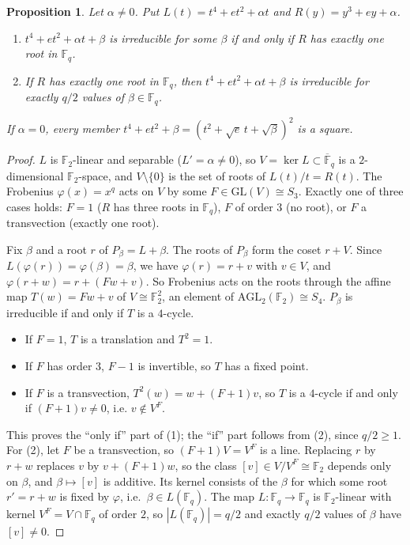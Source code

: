 \documentclass[11pt,a4paper]{amsart}
\newtheorem{proposition}[theorem]{Proposition}
\theoremstyle{definition}
\theoremstyle{remark}
\newcommand{\F}{\mathbb{F}}
\newcommand{\AGL}{\mathrm{AGL}}
\newcommand{\GL}{\mathrm{GL}}
\begin{document}
\begin{proposition}\label{prop:agl}
Let $\alpha\ne0$. Put $L(t)=t^4+et^2+\alpha t$ and $R(y)=y^3+ey+\alpha$.
\begin{enumerate}
\item $t^4+et^2+\alpha t+\beta$ is irreducible for some $\beta$ if and only if $R$ has exactly one root in $\F_q$.
\item If $R$ has exactly one root in $\F_q$, then $t^4+et^2+\alpha t+\beta$ is irreducible for exactly $q/2$ values of
$\beta\in\F_q$.
\end{enumerate}
If $\alpha=0$, every member $t^4+et^2+\beta=(t^2+\sqrt e\,t+\sqrt\beta)^2$ is a square.
\end{proposition}

\begin{proof}
$L$ is $\F_2$-linear and separable ($L'=\alpha\ne0$), so $V=\ker L\subset\overline{\F}_q$ is a $2$-dimensional
$\F_2$-space, and $V\setminus\{0\}$ is the set of roots of $L(t)/t=R(t)$. The Frobenius $\varphi(x)=x^q$ acts on $V$ by
some $F\in\GL(V)\cong S_3$. Exactly one of three cases holds: $F=1$ ($R$ has three roots in $\F_q$), $F$ of order $3$
(no root), or $F$ a transvection (exactly one root).

Fix $\beta$ and a root $r$ of $P_\beta=L+\beta$. The roots of $P_\beta$ form the coset $r+V$. Since
$L(\varphi(r))=\varphi(\beta)=\beta$, we have $\varphi(r)=r+v$ with $v\in V$, and
$\varphi(r+w)=r+(Fw+v)$. So Frobenius acts on the roots through the affine map $T(w)=Fw+v$ of
$V\cong\F_2^2$, an element of $\AGL_2(\F_2)\cong S_4$. $P_\beta$ is irreducible if and only if $T$ is a $4$-cycle.
\begin{itemize}
\item If $F=1$, $T$ is a translation and $T^2=1$.
\item If $F$ has order $3$, $F-1$ is invertible, so $T$ has a fixed point.
\item If $F$ is a transvection, $T^2(w)=w+(F+1)v$, so $T$ is a $4$-cycle if and only if $(F+1)v\ne0$, i.e.
$v\notin V^F$.
\end{itemize}
This proves the ``only if'' part of (1); the ``if'' part follows from (2), since $q/2\ge1$. For (2), let $F$ be a
transvection, so $(F+1)V=V^F$ is a line. Replacing $r$ by $r+w$ replaces $v$ by
$v+(F+1)w$, so the class $[v]\in V/V^F\cong\F_2$ depends only on $\beta$, and $\beta\mapsto[v]$ is additive. Its
kernel consists of the $\beta$ for which some root $r'=r+w$ is fixed by $\varphi$, i.e.\ $\beta\in L(\F_q)$. The map
$L:\F_q\to\F_q$ is $\F_2$-linear with kernel $V^F=V\cap\F_q$ of order $2$, so $|L(\F_q)|=q/2$ and exactly $q/2$ values
of $\beta$ have $[v]\ne0$.
\end{proof}
\end{document}
